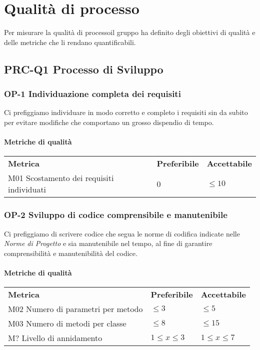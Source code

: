 \section{Qualità di processo}
Per misurare la qualità di processo\glosp il gruppo ha definito degli obiettivi di qualità e delle metriche che li rendano quantificabili.
	\subsection{PRC-Q1 Processo di Sviluppo}
		\subsubsection{OP-1 Individuazione completa dei requisiti} 
			Ci prefiggiamo individuare in modo corretto e completo i requisiti sin da subito per evitare modifiche che comportano un grosso dispendio di tempo.
			\paragraph{Metriche di qualità} \mbox{}
			\begin{longtable} {
					>{}p{80mm} 
					>{}p{25mm}
					>{}p{25mm}
				}
				\rowcolor{gray!50}
				\textbf{Metrica} & \textbf{Preferibile} & \textbf{Accettabile} \TBstrut \TBstrut \\
				M01 Scostamento dei requisiti individuati & 0 & $\le 10$ \TBstrut \\ [2mm]
			\end{longtable}
			
		\subsubsection{OP-2 Sviluppo di codice comprensibile e manutenibile}
			Ci prefiggiamo di scrivere codice che segua le norme di codifica indicate nelle \textit{Norme di Progetto} e sia manutenibile nel tempo, al fine di garantire comprensibilità e manutenibilità del codice.
			\paragraph{Metriche di qualità} \mbox{}
			\begin{longtable} {
					>{}p{80mm} 
					>{}p{25mm}
					>{}p{25mm}
				}
				\rowcolor{gray!50}
				\textbf{Metrica} & \textbf{Preferibile} & \textbf{Accettabile} \TBstrut \TBstrut \\
				M02 Numero di parametri per metodo & $ \le 3$ & $ \le 5$ \TBstrut \\ [2mm]
				M03 Numero di metodi per classe & $ \le 8$ & $ \le 15$ \TBstrut \\ [2mm]
				M? Livello di annidamento & $1 \le x \le 3$ & $1 \le x \le 7$ \TBstrut \\ [2mm]
			\end{longtable}
	
